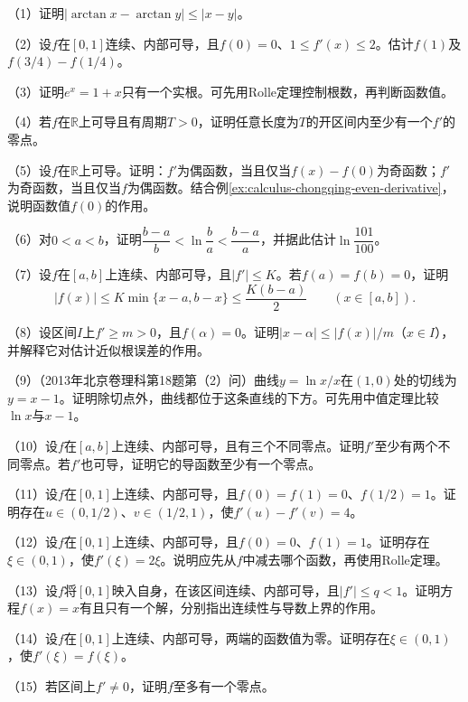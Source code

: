 \newpage
\setlength{\parskip}{3.5pt}
\setlength{\abovedisplayskip}{10pt}
\setlength{\belowdisplayskip}{10pt}
\begin{exercise}[本节习题]
\mbox{}\par\nobreak

（1）证明\(|\arctan x-\arctan y|\le|x-y|\)。

（2）设\(f\)在\([0,1]\)连续、内部可导，且\(f(0)=0\)、\(1\le f'(x)\le2\)。估计\(f(1)\)及\(f(3/4)-f(1/4)\)。

（3）证明\(e^x=1+x\)只有一个实根。可先用Rolle定理控制根数，再判断函数值。

（4）若\(f\)在\(\mathbb R\)上可导且有周期\(T>0\)，证明任意长度为\(T\)的开区间内至少有一个\(f'\)的零点。

（5）设\(f\)在\(\mathbb R\)上可导。证明：\(f'\)为偶函数，当且仅当\(f(x)-f(0)\)为奇函数；\(f'\)为奇函数，当且仅当\(f\)为偶函数。结合例\ref{ex:calculus-chongqing-even-derivative}，说明函数值\(f(0)\)的作用。

（6）对\(0<a<b\)，证明\(\dfrac{b-a}{b}<\ln\dfrac ba<\dfrac{b-a}{a}\)，并据此估计\(\ln\dfrac{101}{100}\)。

（7）设\(f\)在\([a,b]\)上连续、内部可导，且\(|f'|\le K\)。若\(f(a)=f(b)=0\)，证明
\begin{equation*}
 |f(x)|\le K\min\{x-a,b-x\}\le\frac{K(b-a)}2\qquad(x\in[a,b]).
\end{equation*}

（8）设区间\(I\)上\(f'\ge m>0\)，且\(f(\alpha)=0\)。证明\(|x-\alpha|\le|f(x)|/m\)（\(x\in I\)），并解释它对估计近似根误差的作用。

（9）（2013年北京卷理科第18题第（2）问）曲线\(y=\ln x/x\)在\((1,0)\)处的切线为\(y=x-1\)。证明除切点外，曲线都位于这条直线的下方。可先用中值定理比较\(\ln x\)与\(x-1\)。

（10）设\(f\)在\([a,b]\)上连续、内部可导，且有三个不同零点。证明\(f'\)至少有两个不同零点。若\(f'\)也可导，证明它的导函数至少有一个零点。

（11）设\(f\)在\([0,1]\)上连续、内部可导，且\(f(0)=f(1)=0\)、\(f(1/2)=1\)。证明存在\(u\in(0,1/2)\)、\(v\in(1/2,1)\)，使\(f'(u)-f'(v)=4\)。

（12）设\(f\)在\([0,1]\)上连续、内部可导，且\(f(0)=0\)、\(f(1)=1\)。证明存在\(\xi\in(0,1)\)，使\(f'(\xi)=2\xi\)。说明应先从\(f\)中减去哪个函数，再使用Rolle定理。

（13）设\(f\)将\([0,1]\)映入自身，在该区间连续、内部可导，且\(|f'|\le q<1\)。证明方程\(f(x)=x\)有且只有一个解，分别指出连续性与导数上界的作用。

（14）设\(f\)在\([0,1]\)上连续、内部可导，两端的函数值为零。证明存在\(\xi\in(0,1)\)，使\(f'(\xi)=f(\xi)\)。

（15）若区间上\(f'\ne0\)，证明\(f\)至多有一个零点。
\end{exercise}

